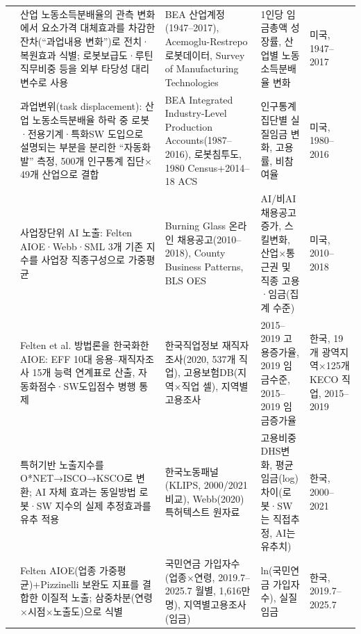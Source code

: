 \documentclass[11pt]{article}
\begin{document}
\begin{longtable}{L{2.3cm}L{4.1cm}L{3.6cm}L{2.6cm}L{2.3cm}}
\citet{acemoglu-2019-automation-and-new-tasks-how} &
산업 노동소득분배율의 관측 변화에서 요소가격 대체효과를 차감한 잔차(``과업내용 변화'')로 전치·복원효과 식별; 로봇보급도·루틴직무비중 등을 외부 타당성 대리변수로 사용 &
BEA 산업계정(1947--2017), Acemoglu-Restrepo 로봇데이터, Survey of Manufacturing Technologies &
1인당 임금총액 성장률, 산업별 노동소득분배율 변화 &
미국, 1947--2017\\

\citet{acemoglu-2022-tasks-automation-and-the-rise} &
과업변위(task displacement): 산업 노동소득분배율 하락 중 로봇·전용기계·특화SW 도입으로 설명되는 부분을 분리한 ``자동화발'' 측정, 500개 인구통계 집단$\times$49개 산업으로 결합 &
BEA Integrated Industry-Level Production Accounts(1987--2016), 로봇침투도, 1980 Census+2014--18 ACS &
인구통계 집단별 실질임금 변화, 고용률, 비참여율 &
미국, 1980--2016\\

\citet{acemoglu-2022-artificial-intelligence-and-jobs-evidence} &
사업장단위 AI 노출: Felten AIOE·Webb·SML 3개 기존 지수를 사업장 직종구성으로 가중평균 &
Burning Glass 온라인 채용공고(2010--2018), County Business Patterns, BLS OES &
AI/비AI 채용공고 증가, 스킬변화, 산업$\times$통근권 및 직종 고용·임금(집계 수준) &
미국, 2010--2018\\

\citet{cheon-2022-ai-employment-wage-effects} &
Felten et al. 방법론을 한국화한 AIOE: EFF 10대 응용--재직자조사 15개 능력 연계표로 산출, 자동화점수·SW도입점수 병행 통제 &
한국직업정보 재직자조사(2020, 537개 직업), 고용보험DB(지역$\times$직업 셀), 지역별고용조사 &
2015--2019 고용증가율, 2019 임금수준, 2015--2019 임금증가율 &
한국, 19개 광역지역$\times$125개 KECO 직업, 2015--2019\\

\citet{han-2023-ai-and-labor-market-change} &
\citet{webb-2020-impact-artificial-intelligence-labor} 특허기반 노출지수를 O*NET→ISCO→KSCO로 변환; AI 자체 효과는 동일방법 로봇·SW 지수의 실제 추정효과를 유추 적용 &
한국노동패널(KLIPS, 2000/2021 비교), Webb(2020) 특허텍스트 원자료 &
고용비중 DHS변화, 평균임금(log) 차이(로봇·SW는 직접추정, AI는 유추치) &
한국, 2000--2021\\

\citet{han-2025-ai-diffusion-youth-employment-decline} &
Felten AIOE(업종 가중평균)+Pizzinelli 보완도 지표를 결합한 이질적 노출; 삼중차분(연령$\times$시점$\times$노출도)으로 식별 &
국민연금 가입자수(업종$\times$연령, 2019.7--2025.7 월별, 1,616만 명), 지역별고용조사(임금) &
ln(국민연금 가입자수), 실질임금 &
한국, 2019.7--2025.7\\


\end{longtable}
\end{document}
